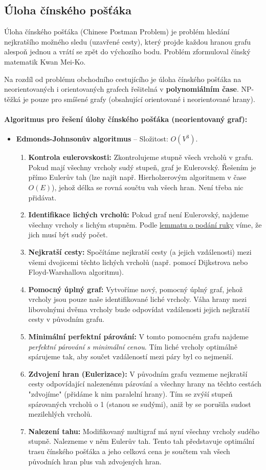 \subsection{Úloha čínského pošťáka}
Úloha čínského pošťáka (Chinese Postman Problem) je problém hledání nejkratšího možného sledu (uzavřené cesty), který projde každou hranou grafu alespoň jednou a vrátí se zpět do výchozího bodu. Problém zformuloval čínský matematik Kwan Mei-Ko. 

Na rozdíl od problému obchodního cestujícího je úloha čínského pošťáka na neorientovaných i orientovaných grafech řešitelná v \textbf{polynomiálním čase}. NP-těžká je pouze pro smíšené grafy (obsahující orientované i neorientované hrany).

\paragraph*{Algoritmus pro řešení úlohy čínského pošťáka (neorientovaný graf):}
\begin{itemize}
\item \textbf{Edmonds-Johnsonův algoritmus} -- Složitost: $O(V^3)$. 
\begin{enumerate}
    \item \textbf{Kontrola eulerovskosti:} Zkontrolujeme stupně všech vrcholů v grafu. Pokud mají všechny vrcholy sudý stupeň, graf je Eulerovský. Řešením je přímo Eulerův tah (lze najít např. Hierholzerovým algoritmem v čase $O(E)$), jehož délka se rovná součtu vah všech hran. Není třeba nic přidávat.
    \item \textbf{Identifikace lichých vrcholů:} Pokud graf není Eulerovský, najdeme všechny vrcholy s lichým stupněm. Podle \hyperref[quote:podaniRuky]{lemmatu o podání ruky} víme, že jich musí být sudý počet.
    \item \textbf{Nejkratší cesty:} Spočítáme nejkratší cesty (a jejich vzdálenosti) mezi všemi dvojicemi těchto lichých vrcholů (např. pomocí Dijkstrova nebo Floyd-Warshallova algoritmu).
    \item \textbf{Pomocný úplný graf:} Vytvoříme nový, pomocný úplný graf, jehož vrcholy jsou pouze naše identifikované liché vrcholy. Váha hrany mezi libovolnými dvěma vrcholy bude odpovídat vzdálenosti jejich nejkratší cesty v původním grafu.
    \item \textbf{Minimální perfektní párování:} V tomto pomocném grafu najdeme \textit{perfektní párování s minimální cenou}. Tím liché vrcholy optimálně spárujeme tak, aby součet vzdáleností mezi páry byl co nejmenší.
    \item \textbf{Zdvojení hran (Eulerizace):} V původním grafu vezmeme nejkratší cesty odpovídající nalezenému párování a všechny hrany na těchto cestách "zdvojíme" (přidáme k nim paralelní hrany). Tím se zvýší stupeň spárovaných vrcholů o 1 (stanou se sudými), aniž by se porušila sudost mezilehlých vrcholů.
    \item \textbf{Nalezení tahu:} Modifikovaný multigraf má nyní všechny vrcholy sudého stupně. Nalezneme v něm Eulerův tah. Tento tah představuje optimální trasu čínského pošťáka a jeho celková cena je součtem vah všech původních hran plus vah zdvojených hran.
\end{enumerate}
\end{itemize}


